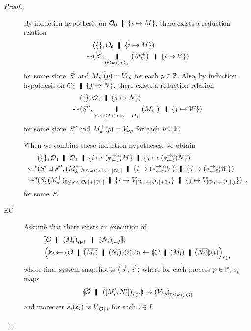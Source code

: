 \begin{proof}
\begin{description}
	  By induction hypothesis on $\hypert_0\hmid \imapsto{M}$,
	  there exists a reduction relation
	  \begin{align*}
	   &\concreteconf{\{\}}{ \hypert_0\hmid \imapsto{M} } \\
	   \reduce&
	   \concreteconf{S'}{\operatorname*{\hmid}_{0\le k<|\hypert_0|}
	   \left(\m{M}_k\right)
	   \hmid \{i\mapsto {V}\}}
	  \end{align*}
	  for some store~$S'$ and ${M}^+_k(p) = V_{kp}$ for each $p\in
	  \mathbb{P}$.
	  Also,
	  by induction hypothesis on $\hypert_1\hmid \jmapsto{N}$,
	  there exists a reduction relation
	  \begin{align*}
	   &\concreteconf{\{\}}{ \hypert_1\hmid \jmapsto{N} } \\
	   \reduce&
	   \concreteconf{S''}{\operatorname*{\hmid}_{|\hypert_0|\le
	   k<|\hypert_0| + |\hypert_1|}
	   \left(\m{M}_k\right)
	   \hmid \{j\mapsto {W}\}}
	  \end{align*}
	  for some store~$S''$ and ${M}^+_k(p) = V_{kp}$ for each $p\in
	  \mathbb{P}$.

	  When we combine these induction hypotheses,
	  we obtain
	  \begin{align*}
	   &\concreteconf{\{\}}{
	   \hypert_0\hmid \hypert_1\hmid \{i\mapsto (\comodL) M\}\hmid
	   \{j\mapsto (\comodR)N\}
	   }\\
	   \reduction & \concreteconf{S'\sqcup S''}{ (\m{M}_k)_{0\le k <
	   |\hypert_0|+ |\hypert_1|} \hmid
	   \{i\mapsto(\comodL)V\} \hmid \{j\mapsto (\comodR)W\}}\\
	   \reduction&
	   \concreteconf{S}{(\m{M}_k)_{0\le k <
	   |\hypert_0|+ |\hypert_1|}\hmid
	   \imapsto{V_{|\hypert_0|+|\hypert_1|+1,i}}
	   \hmid\jmapsto{V_{|\hypert_0|+|\hypert_1|,j}}
	   }\enspace.
	  \end{align*}
	  for some~$S$.
     \item[EC]
	  Assume that there exists an execution of
	  \begin{align*}
	   &\semo{\hypert\hmid \left(M_i\right)_{i\in I} \hmid
	   \left(N_i\right)_{i\in I}}; \\
	   &\left(\p k_i\leftarrow
	   \semoi{\hypert\hmid \overline{(M_i)}\hmid
	   (N_i)}(i)
	   ; \p k_i \leftarrow \semoi{\hypert\hmid {(M_i)}\hmid
	   \overline{(N_i)}}(i)\right)_{i\in I}
	  \end{align*}
	  whose final system snapshot is $\langle{\overrightarrow s, \overrightarrow v}\rangle$
	  where for each process $p\in \mathbb{P}$, $s_p$ maps
	  \[
	   \semoi{\overline{\hypert}\hmid
	  \left(\cotuple{M'_i,N'_i}\right)_{i\in I}}
	  \mapsto
	  \left(V_{kp}\right)_{0\le k < |\hypert|}
	  \]
	  and moreover $s_i(\texttt{k}_i)$ is $V_{|\mathcal{O}|,i}$ for each $i\in
	  I$.


\end{description}
\end{proof}
